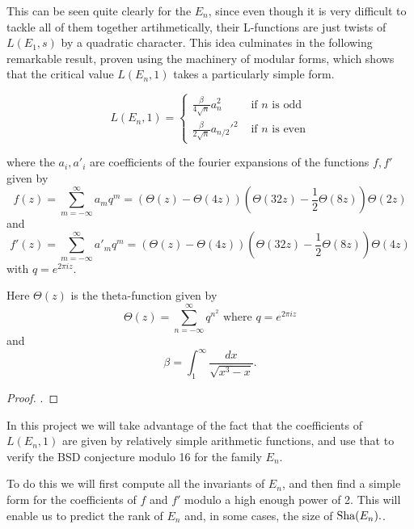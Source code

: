 \documentclass[12pt, a4paper]{report}
\begin{document}
This can be seen quite clearly
for the $E_n$, since even though it is very difficult to tackle all of them
together artihmetically, their L-functions are just twists of $L(E_1,s)$ by a
quadratic character.
This idea culminates in the following remarkable result, proven using
the machinery of modular forms, which shows that the critical value
$L(E_n,1)$ takes a particularly simple form.

\begin{thm}
  \begin{equation} \label{eq:tunnell}
    L(E_n,1) = \begin{cases}
      \frac{\beta}{4\sqrt{n}}a_n^2 & \text{ if $n$ is odd} \\
      \frac{\beta}{2\sqrt{n}}a_{n/2}'^2 & \text{ if $n$ is even}
    \end{cases}
  \end{equation}

  where the $a_i, a'_i$ are coefficients of the fourier expansions of the
  functions $f, f'$ given by
  \begin{equation} \label{eq:mododd}
    f(z) = \sum\limits_{m=-\infty}^\infty a_m q^m
    = (\Theta(z) - \Theta(4z)) \left(\Theta(32z)-\frac{1}{2} \Theta(8z)\right) \Theta(2z)
  \end{equation}
  and
  \begin{equation} \label{eq:modeven}
    f'(z) = \sum\limits_{m=-\infty}^\infty a'_m q^m =
    (\Theta(z) - \Theta(4z)) \left(\Theta(32z)-\frac{1}{2} \Theta(8z)\right) \Theta(4z)
  \end{equation}
  with $q = e^{2\pi i z}$.
  
  Here $\Theta(z)$ is the theta-function given by
  \[ \Theta(z) = \sum\limits_{n = -\infty}^{\infty} q^{n^2} \text{ where } q =
    e^{2\pi iz}\]
  and
  \[\beta = \int_1^\infty \frac{dx}{\sqrt{x^3-x}}.\]
\end{thm}

\begin{proof}
  \cite[See][pages 325-328]{Tunnell}. 
\end{proof}
  
In this project we will take advantage of the fact that the coefficients of
$L(E_n,1)$ are given by relatively simple arithmetic functions, and use that
to verify the BSD conjecture modulo 16 for the family $E_n$.

To do this we will first compute all the invariants of $E_n$,
and then find a simple form for the coefficients of $f$ and $f'$ modulo
a high enough power of 2. This will enable us to predict the rank of $E_n$ and,
in some cases, the size of $\text{\normalfont Sha}(E_n).$.
\end{document}
